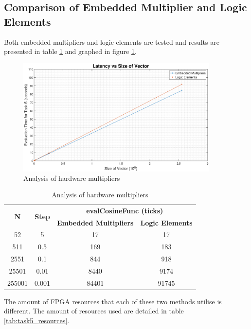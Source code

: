 \documentclass{article}
\begin{document}
\subsection{Comparison of Embedded Multiplier and Logic Elements}
Both embedded multipliers and logic elements are tested and results are presented in table \ref{tab:task5_time} and graphed in figure \ref{fig:task5_time}.\\

\begin{figure}[H]
    \centering
    \includegraphics[width=0.9\textwidth]{graph5.eps}
    \caption{Analysis of hardware multipliers}
    \label{fig:task5_time}
\end{figure}

\begin{table}[H]
  \centering
    \begin{tabular}{|c|c|c|c|}
    \hline
    \multirow{2}[4]{*}{\textbf{N}} & \multirow{2}[4]{*}{\textbf{Step}} & \multicolumn{2}{c|}{\textbf{evalCosineFunc (ticks)}} \\
\cline{3-4}          &       & \textbf{Embedded Multipliers} & \textbf{Logic Elements} \\
    \hline
    52    & 5     & 17    & 17 \\
    \hline
    511   & 0.5   & 169   & 183 \\
    \hline
    2551  & 0.1   & 844   & 918 \\
    \hline
    25501 & 0.01  & 8440  & 9174 \\
    \hline
    255001 & 0.001 & 84401 & 91745 \\
    \hline
    \end{tabular}%
  \caption{Analysis of hardware multipliers}
  \label{tab:task5_time}%
\end{table}%



The amount of FPGA resources that each of these two methods utilise is different. The amount of resources used are detailed in table \ref{tab:task5_resources}.\\
\end{document}
